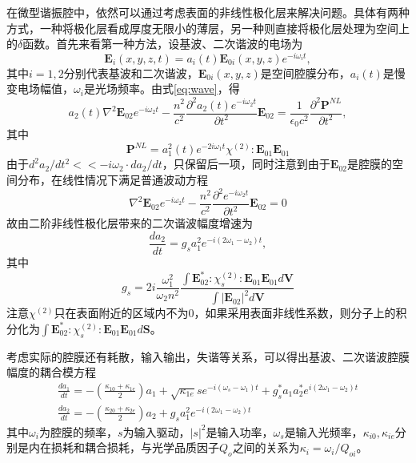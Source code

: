 在微型谐振腔中，依然可以通过考虑表面的非线性极化层来解决问题。具体有两种方式，一种将极化层看成厚度无限小的薄层，另一种则直接将极化层处理为空间上的$\delta$函数。首先来看第一种方法，设基波、二次谐波的电场为
\begin{equation}
\mathbf{E}_i(x,y,z,t) = a_i(t)\mathbf{E}_{0i} (x,y,z)e^{-i\omega_it},
\end{equation}
其中$i = 1, 2$分别代表基波和二次谐波，$\mathbf{E}_{0i} (x,y,z)$是空间腔膜分布，$a_i(t)$是慢变电场幅值，$\omega_i$是光场频率。由式\ref{eq:wave}，得
\begin{equation}
a_2(t)\nabla^2\mathbf{E}_{02}e^{-i\omega_2t}-\frac{n^2}{c^2}\frac{\partial^2a_2(t)e^{-i\omega_2t}}{\partial t^2}\mathbf{E}_{02} = \frac{1}{\epsilon_0c^2}\frac{\partial^2\mathbf{P}^{NL}}{\partial t^2},
\end{equation}
其中
\begin{equation}
\mathbf{P}^{NL} = a_1^2(t)e^{-2i\omega_1t}\chi^{(2)}:\mathbf{E}_{01}\mathbf{E}_{01}
\end{equation}
由于$d^2 a_2/d t^2 << -i\omega_2\cdot d a_2/d t $，只保留后一项，同时注意到由于$\mathbf{E}_{02}$是腔膜的空间分布，在线性情况下满足普通波动方程
\begin{equation}
\nabla^2\mathbf{E}_{02}e^{-i\omega_2t}-\frac{n^2}{c^2}\frac{\partial^2e^{-i\omega_2t}}{\partial t^2}\mathbf{E}_{02} = 0 
\end{equation}
故由二阶非线性极化层带来的二次谐波幅度增速为
\begin{equation}
\frac{da_2}{dt} = g_sa_1^2e^{-i(2\omega_1-\omega_2)t},
\end{equation}
其中
\begin{equation}
g_s = 2i\frac{\omega_1^2}{\omega_2n^2}\frac{\int \mathbf{E}_{02}^*:\chi^{(2)}_s:\mathbf{E}_{01}\mathbf{E}_{01} d\mathbf{V}}{\int |\mathbf{E}_{02}|^2 d\mathbf{V}}
\end{equation}
注意$\chi^{(2)}$只在表面附近的区域内不为0，如果采用表面非线性系数，则分子上的积分化为$\int \mathbf{E}_{02}^*:\chi_s^{(2)}:\mathbf{E}_{01}\mathbf{E}_{01} d\mathbf{S}$。

考虑实际的腔膜还有耗散，输入输出，失谐等关系，可以得出基波、二次谐波腔膜幅度的耦合模方程\cite{haus1991coupled}
\begin{gather}
\label{eq:cpmode}
\frac{da_1}{dt} = -(\frac{\kappa_{10}+\kappa_{1e}}{2} )a_1+\sqrt{\kappa_{1e}}se^{-i(\omega_s-\omega_1)t}+g_s^*a_1a_2^*e^{i(2\omega_1-\omega_2)t} \\
\frac{da_2}{dt} = -(\frac{\kappa_{20}+\kappa_{2e}}{2})a_2+g_sa_1^2e^{-i(2\omega_1-\omega_2)t}
\end{gather}
其中$\omega_i$为腔膜的频率，$s$为输入驱动，$|s|^2$是输入功率，$\omega_s$是输入光频率，$\kappa_{i0}, \kappa_{ie}$分别是内在损耗和耦合损耗，与光学品质因子$Q_o$之间的关系为$\kappa_i = \omega_i/Q_{oi}$。

